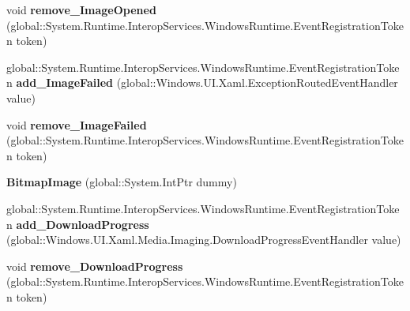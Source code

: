 \begin{DoxyCompactItemize}
\item 
\mbox{\label{class_windows_1_1_u_i_1_1_xaml_1_1_media_1_1_imaging_1_1_bitmap_image_abd3f6dad75c8f3bd98204092748f8218}} 
void {\bfseries remove\+\_\+\+Image\+Opened} (global\+::\+System.\+Runtime.\+Interop\+Services.\+Windows\+Runtime.\+Event\+Registration\+Token token)
\item 
\mbox{\label{class_windows_1_1_u_i_1_1_xaml_1_1_media_1_1_imaging_1_1_bitmap_image_ada8ed4999b6cb99d62a42b9ebf4c4313}} 
global\+::\+System.\+Runtime.\+Interop\+Services.\+Windows\+Runtime.\+Event\+Registration\+Token {\bfseries add\+\_\+\+Image\+Failed} (global\+::\+Windows.\+U\+I.\+Xaml.\+Exception\+Routed\+Event\+Handler value)
\item 
\mbox{\label{class_windows_1_1_u_i_1_1_xaml_1_1_media_1_1_imaging_1_1_bitmap_image_ab71236e1ec9898c1f9eb8269ae973f2f}} 
void {\bfseries remove\+\_\+\+Image\+Failed} (global\+::\+System.\+Runtime.\+Interop\+Services.\+Windows\+Runtime.\+Event\+Registration\+Token token)
\item 
\mbox{\label{class_windows_1_1_u_i_1_1_xaml_1_1_media_1_1_imaging_1_1_bitmap_image_a44808406b9149bd4c36e0a7b1ab40dc8}} 
{\bfseries Bitmap\+Image} (global\+::\+System.\+Int\+Ptr dummy)
\item 
\mbox{\label{class_windows_1_1_u_i_1_1_xaml_1_1_media_1_1_imaging_1_1_bitmap_image_ad8b669920d50527747f0632426807fbf}} 
global\+::\+System.\+Runtime.\+Interop\+Services.\+Windows\+Runtime.\+Event\+Registration\+Token {\bfseries add\+\_\+\+Download\+Progress} (global\+::\+Windows.\+U\+I.\+Xaml.\+Media.\+Imaging.\+Download\+Progress\+Event\+Handler value)
\item 
\mbox{\label{class_windows_1_1_u_i_1_1_xaml_1_1_media_1_1_imaging_1_1_bitmap_image_a2eb34dc2eba36825836cc7578bc62ad3}} 
void {\bfseries remove\+\_\+\+Download\+Progress} (global\+::\+System.\+Runtime.\+Interop\+Services.\+Windows\+Runtime.\+Event\+Registration\+Token token)

\end{DoxyCompactItemize}
